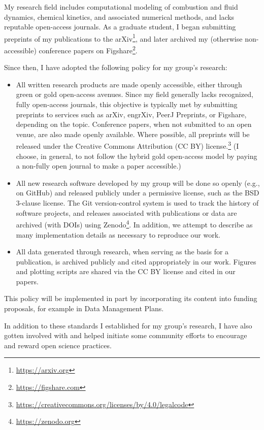 \documentclass[nobib]{tufte-handout}
\begin{document}
My research field includes computational modeling of combustion and fluid dynamics,
chemical kinetics, and associated numerical methods, and lacks reputable open-access
journals. As a graduate student, I began submitting preprints of my publications
to the arXiv\footnote{\url{https://arxiv.org}}, and later archived my
(otherwise non-accessible) conference papers on
Figshare\footnote{\url{https://figshare.com}}.

Since then, I have adopted the following policy for my group's research:
\begin{itemize}
    \item All written research products are made openly accessible, either through
    green or gold open-access avenues. Since my field generally lacks recognized,
    fully open-access journals, this objective is typically met by submitting
    preprints to services such as arXiv, engrXiv, PeerJ Preprints, or Figshare,
    depending on the topic. Conference papers, when not submitted to an open venue,
    are also made openly available. Where possible, all
    preprints will be released under the Creative Commons Attribution (CC BY)
    license.\footnote{\url{https://creativecommons.org/licenses/by/4.0/legalcode}}
    (I choose, in general, to not follow the hybrid gold open-access model by
    paying a non-fully open journal to make a paper accessible.)

    \item All new research software developed by my group will be done so openly
    (e.g., on GitHub) and released publicly under a permissive license, such as
    the BSD 3-clause license. The Git version-control system is used to
    track the history of software projects, and releases associated with
    publications or data are archived (with DOIs) using
    Zenodo\footnote{\url{https://zenodo.org}}.
    In addition, we attempt to describe as many implementation
    details as necessary to reproduce our work.

    \item All data generated through research, when serving as the basis for
    a publication, is archived publicly and cited appropriately in our
    work. Figures and plotting scripts are shared via the CC BY license
    and cited in our papers.
\end{itemize}
This policy will be implemented in part by incorporating its content into
funding proposals, for example in Data Management Plans.

In addition to these standards I established for my group's research, I
have also gotten involved with and helped initiate some community efforts to
encourage and reward open science practices.
\end{document}
